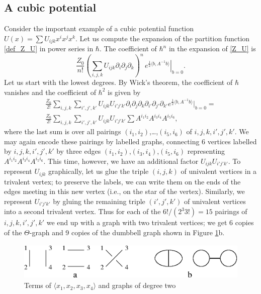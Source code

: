 \documentclass[10pt]{amsart}
\theoremstyle{definition}
\theoremstyle{remark}
\newcommand{\dd}{\partial}
\def\<{\langle}
\def\>{\rangle}
\newcommand{\h}{\hbar}
\newcommand{\GT}{\Theta}
\begin{document}
\subsection{A cubic potential}\label{sub:cubic}
Consider the important example of a cubic potential function
                 $U(x)= \sum U_{ijk}x^i x^j x^k$.
Let us compute the expansion of the partition function \eqref{def_Z_U}
in power series in $\h$.
The coefficient of $\h^n$ in the expansion of \eqref{Z_U} is
$$
  \frac{Z_0}{n!} \left( \sum_{i,j,k} U_{ijk}\dd_i\dd_j\dd_k \right)^n\,
     \left.  e^{\frac12\<b,A^{-1}b\>}\right|_{b=0}.
$$
Let us start with the lowest
degrees. By Wick's theorem, the coefficient of $\h$ vanishes and
the coefficient of $\h^2$ is given by
\begin{multline}\label{h2}
\frac{Z_0}{2!}\sum_{i,j,k}\sum_{i',j',k'} U_{ijk}U_{i'j'k'}\dd_i
\dd_j\dd_k\dd_{i'}\dd_{j'}\dd_{k'}
e^{\frac12\<b,A^{-1}b\>} \big|_{b=0} =\\
\frac{Z_0}{2!}\sum_{i,j,k}\sum_{i',j',k'} U_{i j k} U_{i'j'k'}
              \sum  A^{i_1i_2}A^{i_3i_4}A^{i_5i_6},
\end{multline}
where the last sum is over all pairings
$(i_1,i_2)$,\dots,$(i_5,i_6)$ of $i,j,k,i',j',k'$. We may again
encode these pairings by labelled graphs, connecting 6 vertices
labelled by $i,j,k,i',j',k'$ by three edges
$(i_1,i_2)$,$(i_3,i_4)$,$(i_5,i_6)$ representing
$A^{i_1i_2}A^{i_3i_4}A^{i_5i_6}$. This time, however, we have an
additional factor $U_{i j k}U_{i'j'k'}$. To represent $U_{i j k}$
graphically, let us glue the triple $(i,j,k)$ of univalent
vertices in a trivalent vertex; to preserve the labels, we can
write them on the ends of the edges meeting in this new vertex
(i.e., on the star of the vertex). Similarly, we represent
$U_{i'j'k'}$ by gluing the remaining triple $(i',j',k')$ of
univalent vertices into a second trivalent vertex. Thus for each
of the $6!/ (2^3 3!) =15$ pairings of $i,j,k,i',j',k'$ we end
up with a graph with two trivalent vertices; we get 6 copies of
the $\GT$-graph and 9 copies of the dumbbell graph shown in Figure
\ref{fig:pair}b.
%
\begin{figure}
\includegraphics[height=0.7in]{pair.eps}
\caption{Terms of $\<x_1,x_2,x_3,x_4\>$ and graphs of degree two}
\label{fig:pair}
\end{figure}
\end{document}
